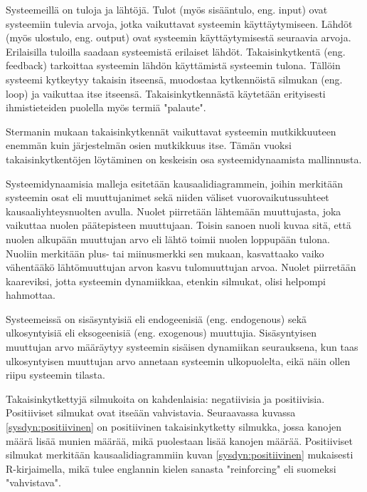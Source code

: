 \documentclass[finnish,12pt,a4paper,pdftex]{article}
\begin{document}
\begin{onehalfspacing}
Systeemeillä on tuloja ja lähtöjä. Tulot (myös sisääntulo, eng. input) ovat systeemiin tulevia arvoja, jotka vaikuttavat systeemin käyttäytymiseen. Lähdöt (myös ulostulo, eng. output) ovat systeemin käyttäytymisestä seuraavia arvoja. Erilaisilla tuloilla saadaan systeemistä erilaiset lähdöt. Takaisinkytkentä (eng. feedback) tarkoittaa systeemin lähdön käyttämistä systeemin tulona. Tällöin systeemi kytkeytyy takaisin itseensä, muodostaa kytkennöistä silmukan (eng. loop) ja vaikuttaa itse itseensä. Takaisinkytkennästä käytetään erityisesti ihmistieteiden puolella myös termiä "palaute". \cite{Sterman2000, WhatIsSystemDynamics} %

Stermanin \cite[s. 12]{Sterman2000} mukaan takaisinkytkennät vaikuttavat systeemin mutkikkuuteen enemmän kuin järjestelmän osien mutkikkuus itse. Tämän vuoksi takaisinkytkentöjen löytäminen on keskeisin osa systeemidynaamista mallinnusta. 

Systeemidynaamisia malleja esitetään kausaalidiagrammein, joihin merkitään systeemin osat eli muuttujanimet sekä niiden väliset vuorovaikutussuhteet kausaaliyhteysnuolten avulla. Nuolet piirretään lähtemään muuttujasta, joka vaikuttaa nuolen päätepisteen muuttujaan. Toisin sanoen nuoli kuvaa sitä, että nuolen alkupään muuttujan arvo eli lähtö toimii nuolen loppupään tulona. Nuoliin merkitään plus- tai miinusmerkki sen mukaan, kasvattaako vaiko vähentääkö lähtömuuttujan arvon kasvu tulomuuttujan arvoa. Nuolet piirretään kaareviksi, jotta systeemin dynamiikkaa, etenkin silmukat, olisi helpompi hahmottaa. \cite{Sterman2000}

Systeemeissä on sisäsyntyisiä eli endogeenisiä (eng. endogenous) sekä ulkosyntyisiä eli eksogeenisiä (eng. exogenous) muuttujia. Sisäsyntyisen muuttujan arvo määräytyy systeemin sisäisen dynamiikan seurauksena, kun taas ulkosyntyisen muuttujan arvo annetaan systeemin ulkopuolelta, eikä näin ollen riipu systeemin tilasta. \cite{Sterman2000} %

Takaisinkytkettyjä silmukoita on kahdenlaisia: negatiivisia ja positiivisia. Positiiviset silmukat ovat itseään vahvistavia. Seuraavassa kuvassa \ref{sysdyn:positiivinen} on positiivinen takaisinkytketty silmukka, jossa kanojen määrä lisää munien määrää, mikä puolestaan lisää kanojen määrää. Positiiviset silmukat merkitään kausaalidiagrammiin kuvan \ref{sysdyn:positiivinen} mukaisesti R-kirjaimella, mikä tulee englannin kielen sanasta "reinforcing" eli suomeksi "vahvistava". \cite[s. 12--13]{Sterman2000}\cite{WhatIsSystemDynamics}


\end{onehalfspacing}
\end{document}
